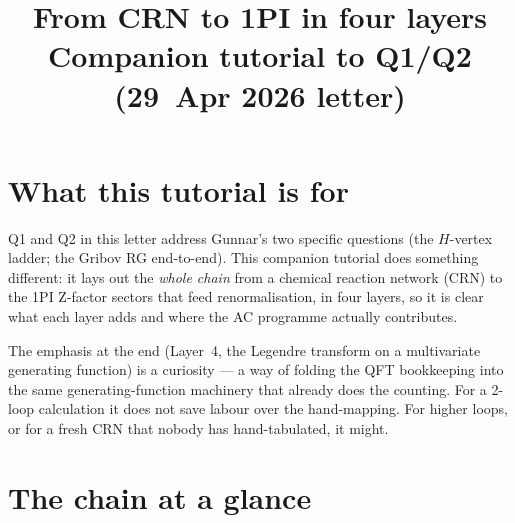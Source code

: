 \documentclass[11pt,a4paper]{article}
\title{\large From CRN to 1PI in four layers\\[2pt]
\normalsize Companion tutorial to Q1/Q2 (29~Apr 2026 letter)}
\author{}
\date{}
\begin{document}
\maketitle
\vspace{-2em}

\section*{What this tutorial is for}

Q1 and Q2 in this letter address Gunnar's two specific questions (the $H$-vertex
ladder; the Gribov RG end-to-end). This companion tutorial does something
different: it lays out the \emph{whole chain} from a chemical reaction network
(CRN) to the 1PI Z-factor sectors that feed renormalisation, in four layers,
so it is clear what each layer adds and where the AC programme actually
contributes.

The emphasis at the end (Layer~4, the Legendre transform on a multivariate
generating function) is a curiosity --- a way of folding the QFT bookkeeping
into the same generating-function machinery that already does the counting.
For a 2-loop calculation it does not save labour over the hand-mapping.
For higher loops, or for a fresh CRN that nobody has hand-tabulated, it might.

\section*{The chain at a glance}
\end{document}
